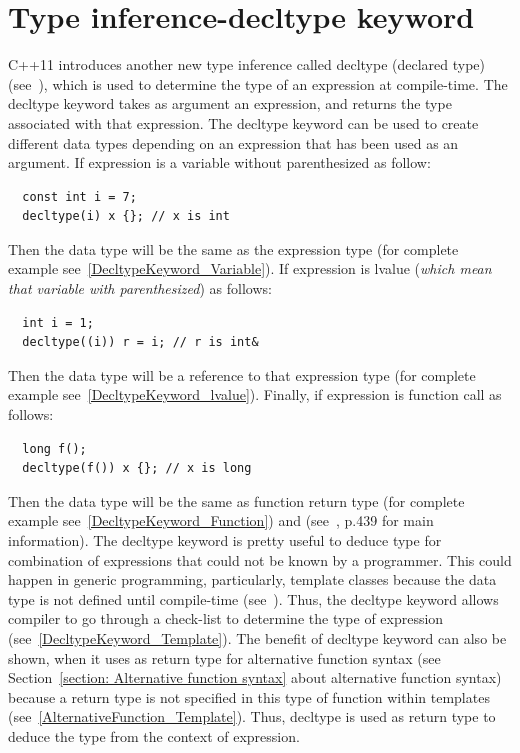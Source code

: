 \documentclass[11pt]{report}
\begin{document}
\section{Type inference-decltype keyword}
\label{section: Decltype keyword}
C++11 introduces another new type inference called decltype (declared type) (see~\cite{Stroustrup:2012:Cpp11}), which is used to determine the type of an expression at compile-time. The decltype keyword takes as argument an expression, and returns the type associated with that expression. The decltype keyword can be used to create different data types depending on an expression that has been used as an argument. If expression is a variable without parenthesized as follow:
\begin{lstlisting}
  const int i = 7;
  decltype(i) x {}; // x is int
\end{lstlisting}
Then the data type will be the same as the expression type (for complete example see~\ref{DecltypeKeyword_Variable}). If expression is lvalue (\emph{which mean that variable with parenthesized}) as follows:
\begin{lstlisting}
  int i = 1;
  decltype((i)) r = i; // r is int&
\end{lstlisting}
Then the data type will be a reference to that expression type (for complete example see~\ref{DecltypeKeyword_lvalue}). Finally, if expression is function call as follows:
\begin{lstlisting}
  long f();
  decltype(f()) x {}; // x is long
\end{lstlisting}
Then the data type will be the same as function return type (for complete example see~\ref{DecltypeKeyword_Function}) and (see~\cite{Prata:2012:Cpp}, p.439 for main information). The decltype keyword is pretty useful to deduce type for combination of expressions that could not be known by a programmer. This could happen in generic programming, particularly, template classes because the data type is not defined until compile-time (see~\cite{Stroustrup:2012:Cpp11}). Thus, the decltype keyword allows compiler to go through a check-list to determine the type of expression (see~\ref{DecltypeKeyword_Template}). The benefit of decltype keyword can also be shown, when it uses as return type for alternative function syntax (see Section~\ref{section: Alternative function syntax} about alternative function syntax) because a return type is not specified in this type of function within templates (see~\ref{AlternativeFunction_Template}). Thus, decltype is used as return type to deduce the type from the context of expression.
\end{document}
